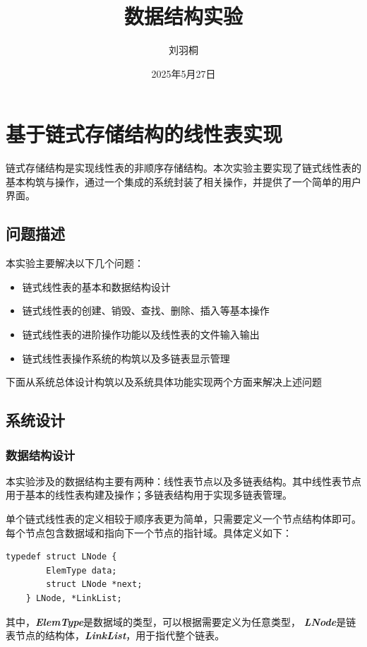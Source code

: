 \documentclass[supercite]{Experimental_Report}
\title{~~~~~~数据结构实验~~~~~~}
\author{刘羽桐}
\date{2025年5月27日}
\theoremstyle{definition}
\begin{document}
\maketitle

\clearpage


\tableofcontents[level=2]

\clearpage


\section{基于链式存储结构的线性表实现}

链式存储结构是实现线性表的非顺序存储结构。本次实验主要实现了链式线性表的基本构筑与操作，通过一个集成的系统封装了相关操作，并提供了一个简单的用户界面。

\subsection{问题描述}

本实验主要解决以下几个问题：

\begin{itemize}[leftmargin=4em, label=$\bullet$]

	\item 链式线性表的基本和数据结构设计
	\item 链式线性表的创建、销毁、查找、删除、插入等基本操作
	\item 链式线性表的进阶操作功能以及线性表的文件输入输出
	\item 链式线性表操作系统的构筑以及多链表显示管理
	
\end{itemize}

下面从系统总体设计构筑以及系统具体功能实现两个方面来解决上述问题

\subsection{系统设计}

\subsubsection{数据结构设计}
	本实验涉及的数据结构主要有两种：线性表节点以及多链表结构。其中线性表节点用于基本的线性表构建及操作；多链表结构用于实现多链表管理。

	单个链式线性表的定义相较于顺序表更为简单，只需要定义一个节点结构体即可。每个节点包含数据域和指向下一个节点的指针域。具体定义如下：
	\begin{lstlisting}[caption={链表节点定义}, label=lst:node]
	typedef struct LNode {
		ElemType data;
		struct LNode *next;
	} LNode, *LinkList;
	\end{lstlisting}
	其中，\textit{\textbf{ElemType}}是数据域的类型，可以根据需要定义为任意类型， \textit{\textbf{LNode}}是链表节点的结构体，\textit{\textbf{LinkList}}，用于指代整个链表。
\end{document}
